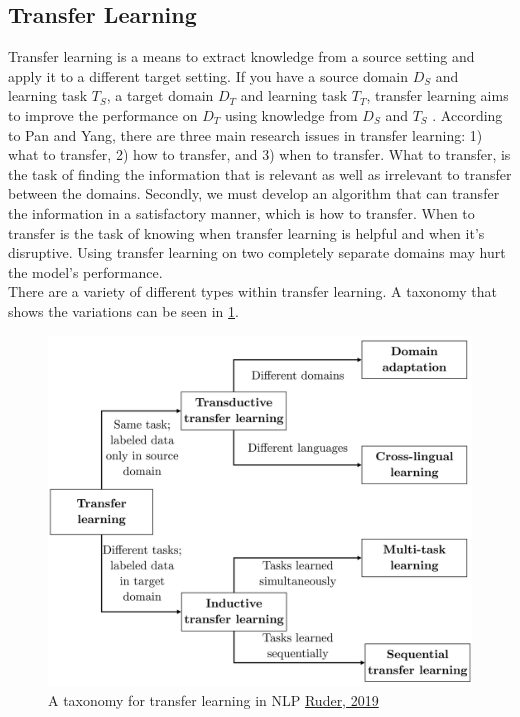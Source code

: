 \subsection{Transfer Learning}
Transfer learning is a means to extract knowledge from a source setting and apply it to a different target setting. If you have a source domain $D_S$ and learning task $T_S$, a target domain $D_T$ and learning task $T_T$, transfer learning aims to improve the performance on $D_T$ using knowledge from $D_S$ and $T_S$ \cite{5288526}. According to Pan and Yang, there are three main research issues in transfer learning: 1) what to transfer, 2) how to transfer, and 3) when to transfer. What to transfer, is the task of finding the information that is relevant as well as irrelevant to transfer between the domains. Secondly, we must develop an algorithm that can transfer the information in a satisfactory manner, which is how to transfer. When to transfer is the task of knowing when transfer learning is helpful and when it's disruptive. Using transfer learning on two completely separate domains may hurt the model's performance\cite{5288526}.\\
There are a variety of different types within transfer learning. A taxonomy that shows the variations can be seen in \ref{fig:tltax}.
\begin{figure}[h!]
	\centering
	\includegraphics[scale=0.13]{img/tl_taxonomy}
	\caption{A taxonomy for transfer learning in NLP \href{ruder.io/thesis/neural_transfer_learning_for_nlp.pdf}{Ruder, 2019}}
	\label{fig:tltax}
\end{figure}%
